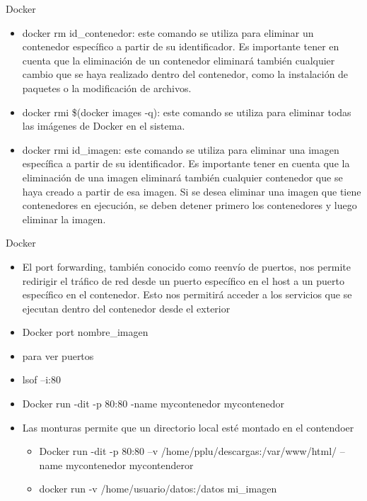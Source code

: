 \documentclass[aspectratio=169,11pt]{beamer}
\begin{document}
\begin{frame}[allowframebreaks]{Docker}
\small
  \begin{itemize}
  \item docker rm id\_contenedor: este comando se utiliza para eliminar un contenedor específico a partir de su identificador. Es importante tener en cuenta que la eliminación de un contenedor eliminará también cualquier cambio que se haya realizado dentro del contenedor, como la instalación de paquetes o la modificación de archivos.
  \item docker rmi \$(docker images -q): este comando se utiliza para eliminar todas las imágenes de Docker en el sistema.
  \item docker rmi id\_imagen: este comando se utiliza para eliminar una imagen específica a partir de su identificador. Es importante tener en cuenta que la eliminación de una imagen eliminará también cualquier contenedor que se haya creado a partir de esa imagen. Si se desea eliminar una imagen que tiene contenedores en ejecución, se deben detener primero los contenedores y luego eliminar la imagen.
  \end{itemize}
\end{frame}

\begin{frame}[allowframebreaks]{Docker}
\small
  \begin{itemize}
  \item El port forwarding, también conocido como reenvío de puertos, nos permite redirigir el tráfico de red desde un puerto específico en el host a un puerto específico en el contenedor. Esto nos permitirá acceder a los servicios que se ejecutan dentro del contenedor desde el exterior
  \item Docker port nombre\_imagen
  \item para ver puertos
  \item lsof --i:80
  \item Docker run -dit -p 80:80 -name mycontenedor mycontenedor
  \item Las monturas permite que un directorio local esté montado en el contendoer
    \begin{itemize}
    \item Docker run -dit -p 80:80 --v /home/pplu/descargas:/var/www/html/ --name mycontenedor mycontenderor
    \item docker run -v /home/usuario/datos:/datos mi\_imagen
    \end{itemize}
  \end{itemize}
\end{frame}
\end{document}
